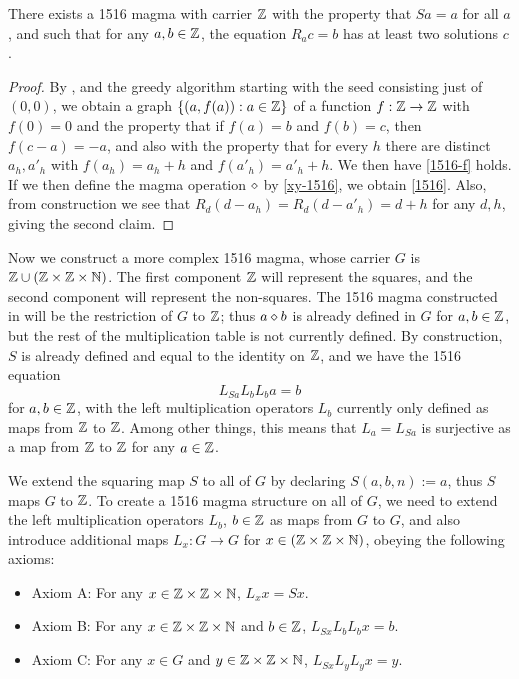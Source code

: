\begin{corollary}\label{1516-base} There exists a 1516 magma with carrier $\mathbb{Z}$ with the property that $Sa=a$ for all $a$, and such that for any $a,b \in \mathbb{Z}$, the equation $R_a c = b$ has at least two solutions $c$.
\end{corollary}

\begin{proof}  By ,  and the greedy algorithm starting with the seed consisting just of $(0,0)$, we obtain a graph $\{ (a,f(a)): a \in \mathbb{Z} \}$ of a function $f:\mathbb{Z} \to \mathbb{Z}$ with $f(0)=0$ and the property that if $f(a)=b$ and $f(b)=c$, then $f(c-a)=-a$, and also with the property that for every $h$ there are distinct $a_h, a'_h$ with $f(a_h)=a_h+h$ and $f(a'_h) = a'_h+h$.  We then have \eqref{1516-f} holds.  If we then define the magma operation $\diamond$ by \eqref{xy-1516}, we obtain \eqref{1516}.  Also, from construction we see that $R_d (d - a_h) = R_d (d - a'_h) = d+h$ for any $d,h$, giving the second claim.
\end{proof}

Now we construct a more complex 1516 magma, whose carrier $G$ is $\mathbb{Z} \cup (\mathbb{Z} \times \mathbb{Z} \times \mathbb{N})$.  The first component $\mathbb{Z}$ will represent the squares, and the second component will represent the non-squares.  The 1516 magma constructed in  will be the restriction of $G$ to $\mathbb{Z}$; thus $a \diamond b$ is already defined in $G$ for $a,b \in \mathbb{Z}$, but the rest of the multiplication table is not currently defined.  By construction, $S$ is already defined and equal to the identity on $\mathbb{Z}$, and we have the 1516 equation
$$ L_{Sa} L_b L_b a = b$$
for $a,b \in \mathbb{Z}$, with the left multiplication operators $L_b$ currently only defined as maps from $\mathbb{Z}$ to $\mathbb{Z}$.  Among other things, this means that $L_a = L_{Sa}$ is surjective as a map from $\mathbb{Z}$ to $\mathbb{Z}$ for any $a \in \mathbb{Z}$.

We extend the squaring map $S$ to all of $G$ by declaring $S(a,b,n) := a$, thus $S$ maps $G$ to $\mathbb{Z}$.  To create a 1516 magma structure on all of $G$, we need to extend the left multiplication operators $L_b$, $b \in \mathbb{Z}$ as maps from $G$ to $G$, and also introduce additional maps $L_x: G \to G$ for $x \in (\mathbb{Z} \times \mathbb{Z} \times \mathbb{N})$, obeying the following axioms:
\begin{itemize}
\item Axiom A: For any $x \in \mathbb{Z} \times \mathbb{Z} \times \mathbb{N}$, $L_x x = Sx$.
\item Axiom B: For any $x \in \mathbb{Z} \times \mathbb{Z} \times \mathbb{N}$ and $b \in \mathbb{Z}$, $L_{Sx} L_b L_b x = b$.
\item Axiom C: For any $x \in G$ and $y \in \mathbb{Z} \times \mathbb{Z} \times \mathbb{N}$, $L_{Sx} L_y L_y x = y$.
\end{itemize}

